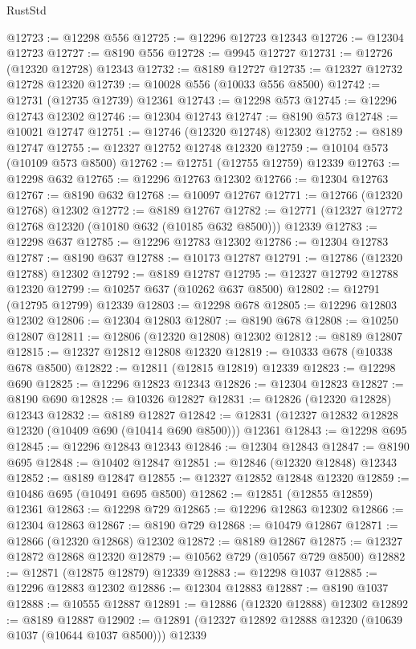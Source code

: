 \begin{lexlean}{RustStd}
\begin{coremodule}
@12723 := @12298 @556
@12725 := @12296 @12723 @12343
@12726 := @12304 @12723
@12727 := @8190 @556
@12728 := @9945 @12727
@12731 := @12726 (@12320 @12728) @12343
@12732 := @8189 @12727
@12735 := @12327 @12732 @12728 @12320
@12739 := @10028 @556 (@10033 @556 @8500)
@12742 := @12731 (@12735 @12739) @12361
@12743 := @12298 @573
@12745 := @12296 @12743 @12302
@12746 := @12304 @12743
@12747 := @8190 @573
@12748 := @10021 @12747
@12751 := @12746 (@12320 @12748) @12302
@12752 := @8189 @12747
@12755 := @12327 @12752 @12748 @12320
@12759 := @10104 @573 (@10109 @573 @8500)
@12762 := @12751 (@12755 @12759) @12339
@12763 := @12298 @632
@12765 := @12296 @12763 @12302
@12766 := @12304 @12763
@12767 := @8190 @632
@12768 := @10097 @12767
@12771 := @12766 (@12320 @12768) @12302
@12772 := @8189 @12767
@12782 := @12771 (@12327 @12772 @12768 @12320 (@10180 @632 (@10185 @632 @8500))) @12339
@12783 := @12298 @637
@12785 := @12296 @12783 @12302
@12786 := @12304 @12783
@12787 := @8190 @637
@12788 := @10173 @12787
@12791 := @12786 (@12320 @12788) @12302
@12792 := @8189 @12787
@12795 := @12327 @12792 @12788 @12320
@12799 := @10257 @637 (@10262 @637 @8500)
@12802 := @12791 (@12795 @12799) @12339
@12803 := @12298 @678
@12805 := @12296 @12803 @12302
@12806 := @12304 @12803
@12807 := @8190 @678
@12808 := @10250 @12807
@12811 := @12806 (@12320 @12808) @12302
@12812 := @8189 @12807
@12815 := @12327 @12812 @12808 @12320
@12819 := @10333 @678 (@10338 @678 @8500)
@12822 := @12811 (@12815 @12819) @12339
@12823 := @12298 @690
@12825 := @12296 @12823 @12343
@12826 := @12304 @12823
@12827 := @8190 @690
@12828 := @10326 @12827
@12831 := @12826 (@12320 @12828) @12343
@12832 := @8189 @12827
@12842 := @12831 (@12327 @12832 @12828 @12320 (@10409 @690 (@10414 @690 @8500))) @12361
@12843 := @12298 @695
@12845 := @12296 @12843 @12343
@12846 := @12304 @12843
@12847 := @8190 @695
@12848 := @10402 @12847
@12851 := @12846 (@12320 @12848) @12343
@12852 := @8189 @12847
@12855 := @12327 @12852 @12848 @12320
@12859 := @10486 @695 (@10491 @695 @8500)
@12862 := @12851 (@12855 @12859) @12361
@12863 := @12298 @729
@12865 := @12296 @12863 @12302
@12866 := @12304 @12863
@12867 := @8190 @729
@12868 := @10479 @12867
@12871 := @12866 (@12320 @12868) @12302
@12872 := @8189 @12867
@12875 := @12327 @12872 @12868 @12320
@12879 := @10562 @729 (@10567 @729 @8500)
@12882 := @12871 (@12875 @12879) @12339
@12883 := @12298 @1037
@12885 := @12296 @12883 @12302
@12886 := @12304 @12883
@12887 := @8190 @1037
@12888 := @10555 @12887
@12891 := @12886 (@12320 @12888) @12302
@12892 := @8189 @12887
@12902 := @12891 (@12327 @12892 @12888 @12320 (@10639 @1037 (@10644 @1037 @8500))) @12339

\end{coremodule}
\end{lexlean}
